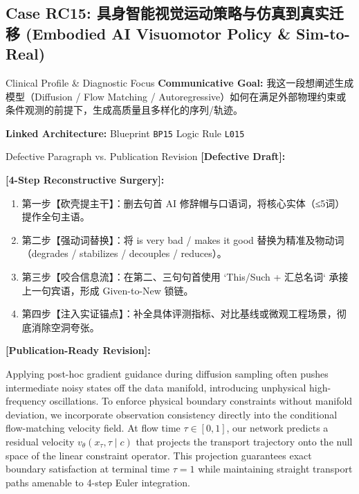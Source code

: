 \subsection{Case RC15: 具身智能视觉运动策略与仿真到真实迁移 (Embodied AI Visuomotor Policy \& Sim-to-Real)}\label{case:RC15}
\begin{ConceptBox}{Clinical Profile \& Diagnostic Focus}
\textbf{Communicative Goal:} 我这一段想阐述生成模型（Diffusion / Flow Matching / Autoregressive）如何在满足外部物理约束或条件观测的前提下，生成高质量且多样化的序列/轨迹。\par
\textbf{Linked Architecture:} Blueprint \texttt{BP15} \enspace\textbar\enspace Logic Rule \texttt{L015}
\end{ConceptBox}
\begin{ExampleBox}{Defective Paragraph vs. Publication Revision}
\textbf{\color{TargetHighlight}[Defective Draft]:}\par
{}\par\vspace{6pt}
\textbf{\color{AcadForest}[4-Step Reconstructive Surgery]:}
\begin{enumerate}[label=\textbf{\color{AcadNavy}Step \arabic*:}, leftmargin=2em]
  \item 第一步【砍壳提主干】：删去句首 AI 修辞帽与口语词，将核心实体（≤5词）提作全句主语。
  \item 第二步【强动词替换】：将 is very bad / makes it good 替换为精准及物动词（degrades / stabilizes / decouples / reduces）。
  \item 第三步【咬合信息流】：在第二、三句句首使用 `This/Such + 汇总名词` 承接上一句宾语，形成 Given-to-New 锁链。
  \item 第四步【注入实证锚点】：补全具体评测指标、对比基线或微观工程场景，彻底消除空洞夸张。
\end{enumerate}\vspace{4pt}
\textbf{\color{AcadNavy}[Publication-Ready Revision]:}\par
Applying post-hoc gradient guidance during diffusion sampling often pushes intermediate noisy states off the data manifold, introducing unphysical high-frequency oscillations. To enforce physical boundary constraints without manifold deviation, we incorporate observation consistency directly into the conditional flow-matching velocity field. At flow time $\tau \in [0, 1]$, our network predicts a residual velocity $v_\theta(x_\tau, \tau \mid c)$ that projects the transport trajectory onto the null space of the linear constraint operator. This projection guarantees exact boundary satisfaction at terminal time $\tau=1$ while maintaining straight transport paths amenable to 4-step Euler integration.
\end{ExampleBox}

